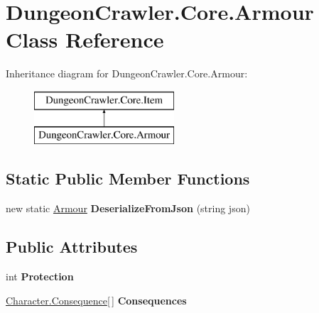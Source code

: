 \hypertarget{class_dungeon_crawler_1_1_core_1_1_armour}{}\section{Dungeon\+Crawler.\+Core.\+Armour Class Reference}
\label{class_dungeon_crawler_1_1_core_1_1_armour}
Inheritance diagram for Dungeon\+Crawler.\+Core.\+Armour\+:\begin{figure}[H]
\begin{center}
\leavevmode
\includegraphics[height=2.000000cm]{class_dungeon_crawler_1_1_core_1_1_armour}
\end{center}
\end{figure}
\subsection*{Static Public Member Functions}
\begin{DoxyCompactItemize}
\item 
\hypertarget{class_dungeon_crawler_1_1_core_1_1_armour_a67a79103dade1a8fa1898c48c87a9cba}{}new static \hyperlink{class_dungeon_crawler_1_1_core_1_1_armour}{Armour} {\bfseries Deserialize\+From\+Json} (string json)\label{class_dungeon_crawler_1_1_core_1_1_armour_a67a79103dade1a8fa1898c48c87a9cba}

\end{DoxyCompactItemize}
\subsection*{Public Attributes}
\begin{DoxyCompactItemize}
\item 
\hypertarget{class_dungeon_crawler_1_1_core_1_1_armour_a9aeafda493381b0d102f92c66d70447f}{}int {\bfseries Protection}\label{class_dungeon_crawler_1_1_core_1_1_armour_a9aeafda493381b0d102f92c66d70447f}

\item 
\hypertarget{class_dungeon_crawler_1_1_core_1_1_armour_a4c12244c933ffdac443404a509daedd1}{}\hyperlink{class_dungeon_crawler_1_1_character_1_1_consequence}{Character.\+Consequence}\mbox{[}$\,$\mbox{]} {\bfseries Consequences}\label{class_dungeon_crawler_1_1_core_1_1_armour_a4c12244c933ffdac443404a509daedd1}

\end{DoxyCompactItemize}

